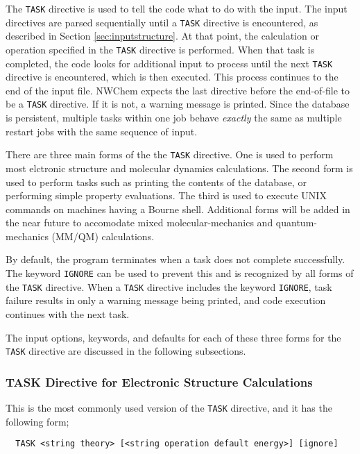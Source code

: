 The \verb+TASK+ directive is used to tell the code what to do with the
input.  The input directives are parsed sequentially until a
\verb+TASK+ directive is encountered, as described in Section
\ref{sec:inputstructure}.  At that point, the calculation or operation
specified in the \verb+TASK+ directive is performed.  When that task
is completed, the code looks for additional input to process until the
next \verb+TASK+ directive is encountered, which is then executed.
This process continues to the end of the input file.  NWChem expects
the last directive before the end-of-file to be a \verb+TASK+
directive.  If it is not, a warning message is printed.  Since the
database is persistent, multiple tasks within one job behave {\em
  exactly} the same as multiple restart jobs with the same sequence of
input.

There are three main forms of the the \verb+TASK+ directive.  One is
used to perform most elctronic structure and molecular dynamics
calculations.  The second form is used to perform tasks such as
printing the contents of the database, or performing simple property
evaluations.  The third is used to execute UNIX commands on machines
having a Bourne shell.  Additional forms will be added in the near
future to accomodate mixed molecular-mechanics and quantum-mechanics
(MM/QM) calculations.

By default, the program terminates when a task does not complete
successfully.  The keyword \verb+IGNORE+ can be used to prevent this
and is recognized by all forms of the \verb+TASK+ directive.  When a
\verb+TASK+ directive includes the keyword \verb+IGNORE+, task failure
results in only a warning message being printed, and code execution
continues with the next task.

The input options, keywords, and defaults for each of
these three forms for the \verb+TASK+ directive are discussed in the
following subsections.

\subsubsection{TASK Directive for Electronic Structure Calculations}

This is the most commonly used version of the \verb+TASK+ directive, and
it has the following form;

\begin{verbatim}
  TASK <string theory> [<string operation default energy>] [ignore]
\end{verbatim}

